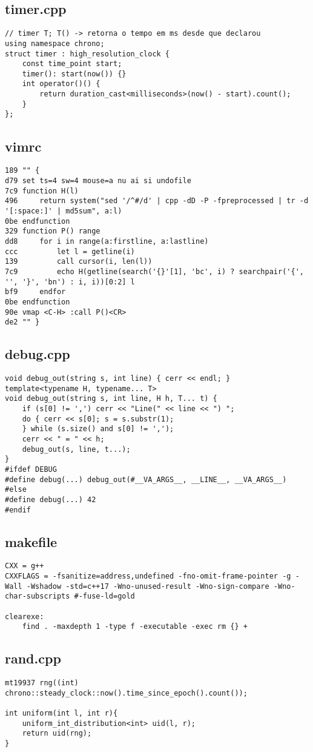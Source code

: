 \documentclass[11pt, a4paper, twoside]{article}
\begin{document}
\subsection{timer.cpp}
\begin{lstlisting}
// timer T; T() -> retorna o tempo em ms desde que declarou
using namespace chrono;
struct timer : high_resolution_clock {
	const time_point start;
	timer(): start(now()) {}
	int operator()() {
		return duration_cast<milliseconds>(now() - start).count();
	}
};
\end{lstlisting}

\subsection{vimrc}
\begin{lstlisting}
189 "" {
d79 set ts=4 sw=4 mouse=a nu ai si undofile
7c9 function H(l)
496 	return system("sed '/^#/d' | cpp -dD -P -fpreprocessed | tr -d '[:space:]' | md5sum", a:l)
0be endfunction
329 function P() range
dd8 	for i in range(a:firstline, a:lastline)
ccc 		let l = getline(i)
139 		call cursor(i, len(l))
7c9 		echo H(getline(search('{}'[1], 'bc', i) ? searchpair('{', '', '}', 'bn') : i, i))[0:2] l
bf9 	endfor
0be endfunction
90e vmap <C-H> :call P()<CR>
de2 "" }
\end{lstlisting}

\subsection{debug.cpp}
\begin{lstlisting}
void debug_out(string s, int line) { cerr << endl; }
template<typename H, typename... T>
void debug_out(string s, int line, H h, T... t) {
    if (s[0] != ',') cerr << "Line(" << line << ") ";
    do { cerr << s[0]; s = s.substr(1);
    } while (s.size() and s[0] != ',');
    cerr << " = " << h;
    debug_out(s, line, t...);
}
#ifdef DEBUG
#define debug(...) debug_out(#__VA_ARGS__, __LINE__, __VA_ARGS__)
#else
#define debug(...) 42
#endif
\end{lstlisting}

\subsection{makefile}
\begin{lstlisting}
CXX = g++
CXXFLAGS = -fsanitize=address,undefined -fno-omit-frame-pointer -g -Wall -Wshadow -std=c++17 -Wno-unused-result -Wno-sign-compare -Wno-char-subscripts #-fuse-ld=gold

clearexe:
	find . -maxdepth 1 -type f -executable -exec rm {} +
\end{lstlisting}

\subsection{rand.cpp}
\begin{lstlisting}
mt19937 rng((int) chrono::steady_clock::now().time_since_epoch().count());

int uniform(int l, int r){
	uniform_int_distribution<int> uid(l, r);
	return uid(rng);
}
\end{lstlisting}
\end{document}
